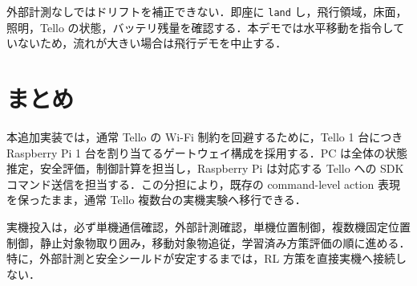 外部計測なしではドリフトを補正できない．即座に \texttt{land} し，飛行領域，床面，照明，Tello の状態，バッテリ残量を確認する．本デモでは水平移動を指令していないため，流れが大きい場合は飛行デモを中止する．

\section{まとめ}
\label{sec:summary}

本追加実装では，通常 Tello の Wi-Fi 制約を回避するために，Tello 1 台につき Raspberry Pi 1 台を割り当てるゲートウェイ構成を採用する．PC は全体の状態推定，安全評価，制御計算を担当し，Raspberry Pi は対応する Tello への SDK コマンド送信を担当する．この分担により，既存の command-level action 表現を保ったまま，通常 Tello 複数台の実機実験へ移行できる．

実機投入は，必ず単機通信確認，外部計測確認，単機位置制御，複数機固定位置制御，静止対象物取り囲み，移動対象物追従，学習済み方策評価の順に進める．特に，外部計測と安全シールドが安定するまでは，RL 方策を直接実機へ接続しない．


